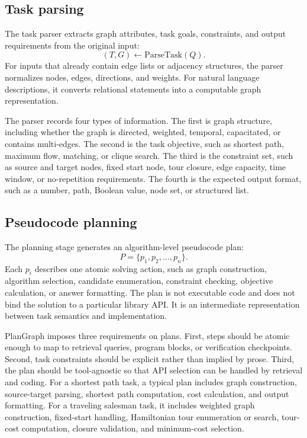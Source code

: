 \documentclass[pdflatex,sn-mathphys-num]{sn-jnl}
\theoremstyle{thmstyleone}
\theoremstyle{thmstyletwo}
\theoremstyle{thmstylethree}
\begin{document}
\subsection{Task parsing}

The task parser extracts graph attributes, task goals, constraints, and output requirements from the original input:
\begin{equation}
(T,G) \leftarrow \mathrm{ParseTask}(Q).
\end{equation}
For inputs that already contain edge lists or adjacency structures, the parser normalizes nodes, edges, directions, and weights. For natural language descriptions, it converts relational statements into a computable graph representation.

The parser records four types of information. The first is graph structure, including whether the graph is directed, weighted, temporal, capacitated, or contains multi-edges. The second is the task objective, such as shortest path, maximum flow, matching, or clique search. The third is the constraint set, such as source and target nodes, fixed start node, tour closure, edge capacity, time window, or no-repetition requirements. The fourth is the expected output format, such as a number, path, Boolean value, node set, or structured list.

\subsection{Pseudocode planning}

The planning stage generates an algorithm-level pseudocode plan:
\begin{equation}
P=\{p_1,p_2,\ldots,p_n\}.
\end{equation}
Each $p_i$ describes one atomic solving action, such as graph construction, algorithm selection, candidate enumeration, constraint checking, objective calculation, or answer formatting. The plan is not executable code and does not bind the solution to a particular library API. It is an intermediate representation between task semantics and implementation.

PlanGraph imposes three requirements on plans. First, steps should be atomic enough to map to retrieval queries, program blocks, or verification checkpoints. Second, task constraints should be explicit rather than implied by prose. Third, the plan should be tool-agnostic so that API selection can be handled by retrieval and coding. For a shortest path task, a typical plan includes graph construction, source-target parsing, shortest path computation, cost calculation, and output formatting. For a traveling salesman task, it includes weighted graph construction, fixed-start handling, Hamiltonian tour enumeration or search, tour-cost computation, closure validation, and minimum-cost selection.
\end{document}

